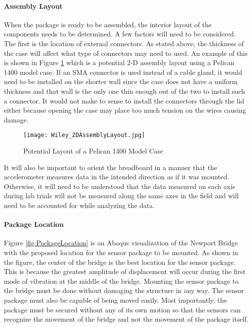 \paragraph{Assembly Layout}


When the package is ready to be assembled, the interior layout of the components needs to be determined.  A few factors will need to be considered. 
The first is the location of external connectors.  As stated above, the thickness of the case will affect what type of connectors may need to used. 
An example of this is shown in Figure \ref{fig:Assembly} which is a potential 2-D assembly layout using a Pelican 1400 model case.  If an SMA
connector is used instead of a cable gland, it would need to be installed on the shorter wall since the case does not have a uniform thickness and
that wall is the only one thin enough out of the two to install such a connector.  It would not make to sense to install the connectors through
the lid either because opening the case may place too much tension on the wires causing damage.  

\begin{figure}[h]
\centering
\texttt{[image: Wiley\_2DAssemblyLayout.jpg]}
\caption{\label{fig:Assembly} Potential Layout of a Pelican 1400 Model Case}
\end{figure}

It will also be important to orient the breadboard in a manner that the accelerometer measures data in the intended direction as if it was mounted. 
Otherwise, it will need to be understood that the data measured on each axis during lab trials will not be measured along the same axes in the field and
will need to be accounted for while analyzing the data.  

\paragraph{Package Location}

\indent Figure \ref{fig:PackageLocation} is an Abaqus visualization of the Newport Bridge with the proposed location for the sensor package to be mounted.
As shown in the figure, the center of the bridge is the best location for the sensor package. This is because the greatest amplitude of displacement will
occur during the first mode of vibration at the middle of the bridge. Mounting the sensor package to the bridge must be done without damaging the
structure in any way. The sensor package must also be capable of being moved easily. Most importantly, the package must be secured without any of its
own motion so that the sensors can recognize the movement of the bridge and not the movement of the package itself. 

